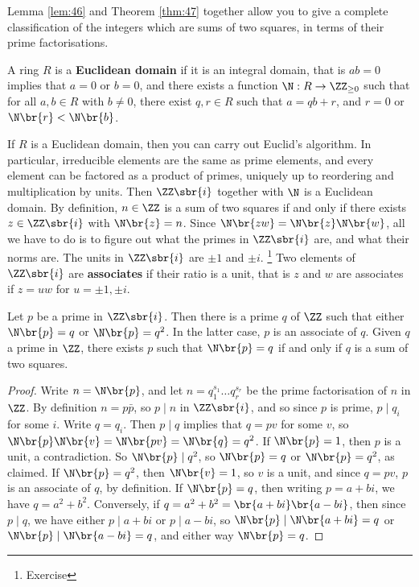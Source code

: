 Lemma \ref{lem:46} and Theorem \ref{thm:47} together allow you to give a complete classification of the integers which are sums of two squares, in terms of their prime factorisations.

\begin{definition}
A ring $ R $ is a \textbf{Euclidean domain} if it is an integral domain, that is $ ab = 0 $ implies that $ a = 0 $ or $ b = 0 $, and there exists a function $ \N : R \to \ZZ_{\ge 0} $ such that for all $ a, b \in R $ with $ b \ne 0 $, there exist $ q, r \in R $ such that $ a = qb + r $, and $ r = 0 $ or $ \N\br{r} < \N\br{b} $.
\end{definition}

If $ R $ is a Euclidean domain, then you can carry out Euclid's algorithm. In particular, irreducible elements are the same as prime elements, and every element can be factored as a product of primes, uniquely up to reordering and multiplication by units. Then $ \ZZ\sbr{i} $ together with $ \N $ is a Euclidean domain. By definition, $ n \in \ZZ $ is a sum of two squares if and only if there exists $ z \in \ZZ\sbr{i} $ with $ \N\br{z} = n $. Since $ \N\br{zw} = \N\br{z}\N\br{w} $, all we have to do is to figure out what the primes in $ \ZZ\sbr{i} $ are, and what their norms are. The units in $ \ZZ\sbr{i} $ are $ \pm 1 $ and $ \pm i $. \footnote{Exercise} Two elements of $ \ZZ\sbr{i} $ are \textbf{associates} if their ratio is a unit, that is $ z $ and $ w $ are associates if $ z = uw $ for $ u = \pm 1, \pm i $.


\begin{lemma}
Let $ p $ be a prime in $ \ZZ\sbr{i} $. Then there is a prime $ q $ of $ \ZZ $ such that either $ \N\br{p} = q $ or $ \N\br{p} = q^2 $. In the latter case, $ p $ is an associate of $ q $. Given $ q $ a prime in $ \ZZ $, there exists $ p $ such that $ \N\br{p} = q $ if and only if $ q $ is a sum of two squares.
\end{lemma}

\begin{proof}
Write $ n = \N\br{p} $, and let $ n = q_1^{s_1} \dots q_r^{s_r} $ be the prime factorisation of $ n $ in $ \ZZ $. By definition $ n = p\bar{p} $, so $ p \mid n $ in $ \ZZ\sbr{i} $, and so since $ p $ is prime, $ p \mid q_i $ for some $ i $. Write $ q = q_i $. Then $ p \mid q $ implies that $ q = pv $ for some $ v $, so $ \N\br{p}\N\br{v} = \N\br{pv} = \N\br{q} = q^2 $. If $ \N\br{p} = 1 $, then $ p $ is a unit, a contradiction. So $ \N\br{p} \mid q^2 $, so $ \N\br{p} = q $ or $ \N\br{p} = q^2 $, as claimed. If $ \N\br{p} = q^2 $, then $ \N\br{v} = 1 $, so $ v $ is a unit, and since $ q = pv $, $ p $ is an associate of $ q $, by definition. If $ \N\br{p} = q $, then writing $ p = a + bi $, we have $ q = a^2 + b^2 $. Conversely, if $ q = a^2 + b^2 = \br{a + bi}\br{a - bi} $,
then since $ p \mid q $, we have either $ p \mid a + bi $ or $ p \mid a - bi $, so $ \N\br{p} \mid \N\br{a + bi} = q $ or $ \N\br{p} \mid \N\br{a - bi} = q $, and either way $ \N\br{p} = q $.
\end{proof}

